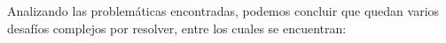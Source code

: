 




Analizando las problemáticas encontradas, podemos concluir que quedan varios
desafíos complejos por resolver, entre los cuales se encuentran:

